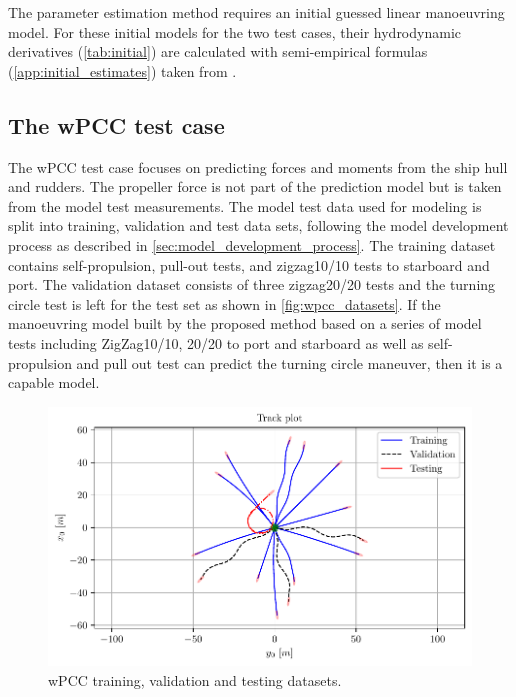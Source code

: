 \noindent The parameter estimation method requires an initial guessed linear manoeuvring model. For these initial models for the two test cases, their hydrodynamic derivatives (\autoref{tab:initial}) are calculated with semi-empirical formulas (\autoref{app:initial_estimates}) taken from \cite{brix_manoeuvring_1993}. 



\subsection{The wPCC test case}
\label{\detokenize{05.01_case_studies:the-wpcc-test-scenarios}}

The wPCC test case focuses on predicting forces and moments from the ship hull and rudders. The propeller force is not part of the prediction model but is taken from the model test measurements.
The model test data used for modeling is split into training, validation and test data sets, following the model development process as described in \autoref{sec:model_development_process}. The training dataset contains self-propulsion, pull-out tests, and zigzag10/10 tests to starboard and port. The validation dataset consists of three zigzag20/20 tests and the turning circle test is left for the test set as shown in \autoref{fig:wpcc_datasets}.
If the manoeuvring model built by the proposed method based on a series of model tests including ZigZag10/10, 20/20 to port and starboard as well as self-propulsion and pull out test \cite{imo_standards_2002} can predict the turning circle maneuver, then it is a capable model.

\begin{figure}[!htb]
\centering
\includegraphics[width=\linewidth]{kappa/images/3.pdf}
\caption{wPCC training, validation and testing datasets.}
\label{fig:wpcc_datasets}
\end{figure}

